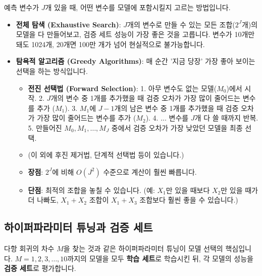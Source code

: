 \documentclass[11pt,a4paper]{book}
\theoremstyle{definition}
\begin{document}
예측 변수가 $J$개 있을 때, 어떤 변수를 모델에 포함시킬지 고르는 방법입니다.

\begin{itemize}
    \item \textbf{전체 탐색 (Exhaustive Search)}: $J$개의 변수로 만들 수 있는 모든 조합($2^J$개)의 모델을 다 만들어보고, 검증 세트 성능이 가장 좋은 것을 고릅니다. 변수가 10개만 돼도 1024개, 20개면 100만 개가 넘어 현실적으로 불가능합니다.
    \item \textbf{탐욕적 알고리즘 (Greedy Algorithms)}: 매 순간 '지금 당장' 가장 좋아 보이는 선택을 하는 방식입니다.
        \begin{itemize}
            \item \textbf{전진 선택법 (Forward Selection)}:
                1. 아무 변수도 없는 모델($M_0$)에서 시작.
                2. $J$개의 변수 중 1개를 추가했을 때 검증 오차가 가장 많이 줄어드는 변수를 추가 ($M_1$).
                3. $M_1$에 $J-1$개의 남은 변수 중 1개를 추가했을 때 검증 오차가 가장 많이 줄어드는 변수를 추가 ($M_2$).
                4. ... 변수를 $J$개 다 쓸 때까지 반복.
                5. 만들어진 $M_0, M_1, \dots, M_J$ 중에서 검증 오차가 가장 낮았던 모델을 최종 선택.
            \item (이 외에 후진 제거법, 단계적 선택법 등이 있습니다.)
            \item \textbf{장점}: $2^J$에 비해 $O(J^2)$ 수준으로 계산이 훨씬 빠릅니다.
            \item \textbf{단점}: 최적의 조합을 놓칠 수 있습니다. (예: $X_1$만 있을 때보다 $X_2$만 있을 때가 더 나빠도, $X_1+X_2$ 조합이 $X_1+X_3$ 조합보다 훨씬 좋을 수 있습니다.)
        \end{itemize}
\end{itemize}

\subsection{하이퍼파라미터 튜닝과 검증 세트}

다항 회귀의 차수 $M$을 찾는 것과 같은 하이퍼파라미터 튜닝이 모델 선택의 핵심입니다.
$M=1, 2, 3, \dots, 10$까지의 모델을 모두 \textbf{학습 세트}로 학습시킨 뒤, 각 모델의 성능을 \textbf{검증 세트}로 평가합니다.
\end{document}
